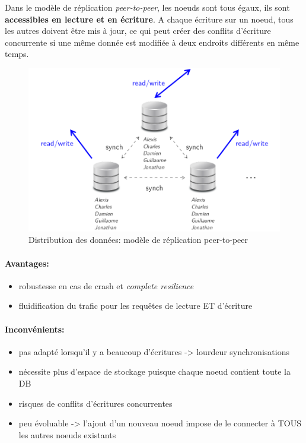 \item{}
{\vrai}
{Dans le modèle de réplication \textit{peer-to-peer}, les noeuds sont tous égaux, ils sont \textbf{accessibles en lecture et en écriture}. A chaque écriture sur un noeud, tous les autres doivent être mis à jour, ce qui peut créer des conflits d'écriture concurrente si une même donnée est modifiée à deux endroits différents en même temps.
\begin{figure}[!h]
\center\includegraphics[scale=.3]{images/replication-peertopeer}
\caption{Distribution des données: modèle de réplication peer-to-peer \cite{ref1}}
\end{figure}

\paragraph{Avantages:}
\begin{itemize}\setlength{\itemsep}{.2em}
\item[\textcolor{dkgreen}{\ding{52}}]robustesse en cas de crash et \textit{complete resilience}
\item[\textcolor{dkgreen}{\ding{52}}]fluidification du trafic pour les requêtes de lecture ET d'écriture
\end{itemize}

\paragraph{Inconvénients:}
\begin{itemize}\setlength{\itemsep}{.2em}
\item[\textcolor{dkred}{\ding{56}}]pas adapté lorsqu'il y a beaucoup d'écritures -> lourdeur synchronisations
\item[\textcolor{dkred}{\ding{56}}]nécessite plus d'espace de stockage puisque chaque noeud contient toute la DB
\item[\textcolor{dkred}{\ding{56}}]risques de conflits d'écritures concurrentes
\item[\textcolor{dkred}{\ding{56}}]peu évoluable -> l'ajout d'un nouveau noeud impose de le connecter à TOUS les autres noeuds existants
\end{itemize}
}


